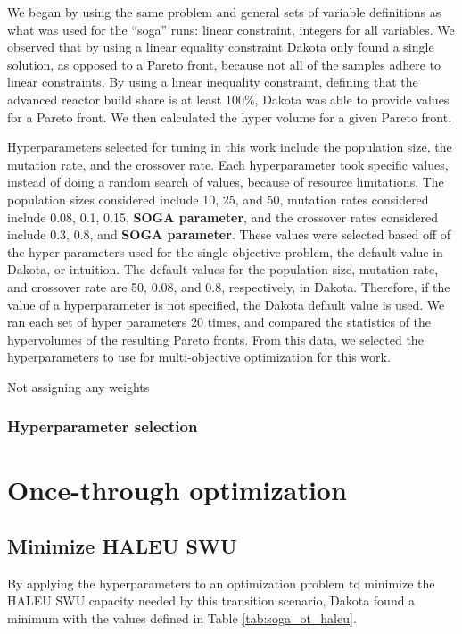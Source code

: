 We began by using the same problem and general sets of variable definitions 
as what was used for the ``soga'' runs: linear constraint, integers for 
all variables. We observed that by using a linear equality constraint
Dakota only found a single solution, as opposed to a Pareto front, because 
not all of the samples adhere to linear constraints. By using a linear 
inequality constraint, defining that the advanced reactor build share is 
at least 100\%, Dakota was able to provide values for a Pareto front. 
We then calculated the hyper volume 
for a given Pareto front. 

Hyperparameters selected for tuning in this work include the 
population size, the mutation rate, and the crossover rate. Each 
hyperparameter took specific values, instead of doing a random 
search of values, because of resource limitations. The population 
sizes considered include 10, 25, and 50, mutation rates considered 
include 0.08, 0.1, 0.15, \textbf{SOGA parameter}, and the crossover rates 
considered include 0.3, 0.8, and \textbf{SOGA parameter}. These values 
were selected based off of the hyper parameters used for the single-objective 
problem, the default value in Dakota, or intuition. The default values for 
the population size, mutation rate, and crossover rate are 50, 
0.08, and 0.8, respectively, in Dakota. Therefore, if the value of a 
hyperparameter is not specified, the Dakota default value is used.  
We ran each set of hyper 
parameters 20 times, and compared the statistics of the hypervolumes of 
the resulting Pareto fronts. From this data, we selected the 
hyperparameters to use for multi-objective optimization for this work. 





Not assigning any weights

\subsubsection{Hyperparameter selection}

\section{Once-through optimization}
\subsection{Minimize HALEU SWU}
By applying the hyperparameters to an optimization problem to minimize the 
\gls{HALEU} \gls{SWU} capacity needed by this transition scenario, Dakota
found a minimum with the values defined in Table \ref{tab:soga_ot_haleu}.

